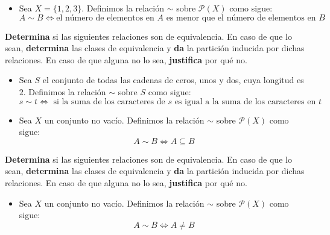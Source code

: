 \documentclass[oneside]{style}
\begin{document}
\begin{questions}[label=\protect\circled{\bfseries\arabic*}]
{\begin{itemize}
            \item Sea $X = \{1,2,3\}$. Definimos la relación $\sim$ sobre 
            $\mathcal{P}(X)$ como sigue:
            \begin{equation*}
                A \sim B \Leftrightarrow \text{el número de elementos en } A 
                \text{ es menor que el número de elementos en } B
            \end{equation*}
        \end{itemize}
    }

    \question
    {
        \textbf{Determina} si las siguientes relaciones son de equivalencia. 
        En caso de que lo sean, \textbf{determina} las clases de equivalencia 
        y \textbf{da} la partición inducida por dichas relaciones. En caso de 
        que alguna no lo sea, \textbf{justifica} por qué no.
        \begin{itemize}
            \item Sea $S$ el conjunto de todas las cadenas de ceros, unos y 
            dos, cuya longitud es $2$. Definimos la relación $\sim$ sobre $S$
            como sigue:
            \begin{equation*}
                s \sim t \Leftrightarrow \text{ si la suma de los caracteres 
                de } s \text{ es igual a la suma de los caracteres en } t
            \end{equation*} 

            \item Sea $X$ un conjunto no vacío. Definimos la relación $\sim$ 
            sobre $\mathcal{P}(X)$ como sigue:
            \begin{equation*}
                A \sim B \Leftrightarrow A \subseteq B
            \end{equation*}
        \end{itemize}
    }

    \question
    {
        \textbf{Determina} si las siguientes relaciones son de equivalencia. 
        En caso de que lo sean, \textbf{determina} las clases de equivalencia 
        y \textbf{da} la partición inducida por dichas relaciones. En caso de 
        que alguna no lo sea, \textbf{justifica} por qué no.
        \begin{itemize}
            \item Sea $X$ un conjunto no vacío. Definimos la relación $\sim$
            sobre $\mathcal{P}(X)$ como sigue:
            \begin{equation*}
                A \sim B \Leftrightarrow A \neq B
            \end{equation*}


\end{itemize}}
\end{questions}
\end{document}
